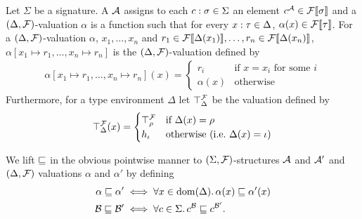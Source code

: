 \documentclass[a4paper,twoside,notitlepage,openright,11pt]{report}
\begin{document}
Let $\Sigma$ be a signature. A  $\mathcal A$ assigns to each $c:\sigma\in\Sigma$ an element $c^\mathcal A\in{\mathcal F}\llbracket\sigma\rrbracket$ and a $(\Delta,\mathcal F)$-valuation $\alpha$ is a function such that for every $x:\tau\in\Delta$, $\alpha(x)\in{\mathcal F}\llbracket\tau\rrbracket$. For a $(\Delta,\mathcal F)$-valuation $\alpha$, $x_1,\ldots,x_n$ and $r_1\in{\mathcal F}\llbracket\Delta(x_1)\rrbracket,\ldots,r_n\in{\mathcal F}\llbracket\Delta(x_n)\rrbracket$, $\alpha[x_1\mapsto r_1,\ldots,x_n\mapsto r_n]$ is the $(\Delta,\mathcal F)$-valuation defined by
\begin{align*}
  \alpha[x_1\mapsto r_1,\ldots,x_n\mapsto r_n](x)=
  \begin{cases}
    r_i&\text{if $x=x_i$ for some $i$}\\
    \alpha(x)&\text{otherwise}
  \end{cases}
\end{align*}
Furthermore, for a type environment $\Delta$ let $\top_\Delta^\mathcal F$ be the valuation defined by
\begin{align*}
  \top_\Delta^\mathcal F(x)=
  \begin{cases}
    \top_\rho^\mathcal F&\text{if }\Delta(x)=\rho\\
    h_\iota&\text{otherwise (i.e.\ $\Delta(x)=\iota$)}
  \end{cases}
\end{align*}


We lift $\sqsubseteq$ in the obvious pointwise manner to $(\Sigma,\mathcal F)$-structures $\mathcal A$ and $\mathcal A'$ and $(\Delta,\mathcal F)$ valuations $\alpha$ and $\alpha'$ by defining
\begin{align*}
  \alpha\sqsubseteq\alpha'&\iff\forall x\in\operatorname{dom}(\Delta)\ldotp\alpha(x)\sqsubseteq\alpha'(x)\\
  \mathcal B\sqsubseteq\mathcal B'&\iff\forall c\in\Sigma\ldotp c^\mathcal B\sqsubseteq c^{\mathcal B'}.
\end{align*}
\end{document}
